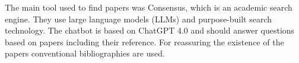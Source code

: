 The main tool used to find papers was Consensus, which is an academic search engine. They use large language models (LLMs) and purpose-built search technology. The chatbot is based on ChatGPT 4.0 and should answer questions based on papers including their reference. For reassuring the existence of the papers conventional bibliographies are used.